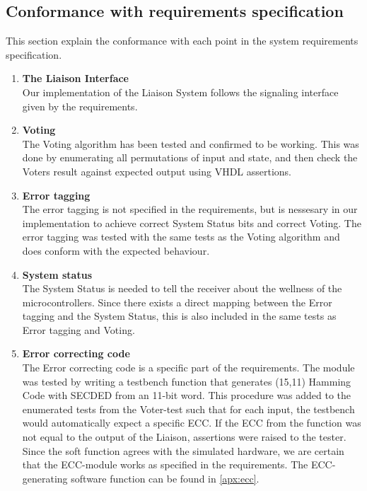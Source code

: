 \subsection{Conformance with requirements specification}
This section explain the conformance with each point in the system requirements specification.
\begin{enumerate}
    \item{\textbf{The Liaison Interface}} \hfill\\
        Our implementation of the Liaison System follows the signaling interface given by the requirements\cite{task}.

    \item{\textbf{Voting}} \hfill\\
        The Voting algorithm has been tested and confirmed to be working. This was done by enumerating all
        permutations of input and state, and then check the Voters result against expected output using
        VHDL assertions.

    \item{\textbf{Error tagging}} \hfill\\
        The error tagging is not specified in the requirements, but is nessesary in our implementation to
        achieve correct System Status bits and correct Voting. The error tagging was tested with the same
        tests as the Voting algorithm and does conform with the expected behaviour.

    \item{\textbf{System status}} \hfill\\
        The System Status is needed to tell the receiver about the wellness of the microcontrollers. Since
        there exists a direct mapping between the Error tagging and the System Status, this is also
        included in the same tests as Error tagging and Voting.

    \item{\textbf{Error correcting code}} \hfill\\
        The Error correcting code is a specific part of the requirements\cite{task}. The module was tested by writing
        a testbench function that generates (15,11) Hamming Code with SECDED from an 11-bit word. This
        procedure was added to the enumerated tests from the Voter-test such that for each input, the testbench
        would automatically expect a specific ECC. If the ECC from the function was not equal to the output
        of the Liaison, assertions were raised to the tester. Since the soft function agrees with the simulated
        hardware, we are certain that the ECC-module works as specified in the requirements. The ECC-generating
        software function can be found in \autoref{apx:ecc}.


\end{enumerate}
